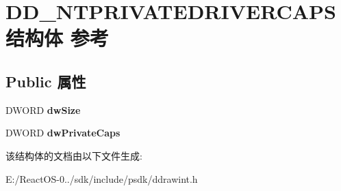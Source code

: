 \hypertarget{struct_d_d___n_t_p_r_i_v_a_t_e_d_r_i_v_e_r_c_a_p_s}{}\section{D\+D\+\_\+\+N\+T\+P\+R\+I\+V\+A\+T\+E\+D\+R\+I\+V\+E\+R\+C\+A\+P\+S结构体 参考}
\label{struct_d_d___n_t_p_r_i_v_a_t_e_d_r_i_v_e_r_c_a_p_s}
\subsection*{Public 属性}
\begin{DoxyCompactItemize}
\item 
\mbox{\label{struct_d_d___n_t_p_r_i_v_a_t_e_d_r_i_v_e_r_c_a_p_s_a02fbee099e21a7f4ac960c6bdc950799}} 
D\+W\+O\+RD {\bfseries dw\+Size}
\item 
\mbox{\label{struct_d_d___n_t_p_r_i_v_a_t_e_d_r_i_v_e_r_c_a_p_s_adc10ec1619e2ca2af0badf0f9dbe8056}} 
D\+W\+O\+RD {\bfseries dw\+Private\+Caps}
\end{DoxyCompactItemize}


该结构体的文档由以下文件生成\+:\begin{DoxyCompactItemize}
\item 
E\+:/\+React\+O\+S-\/0../sdk/include/psdk/ddrawint.\+h\end{DoxyCompactItemize}
